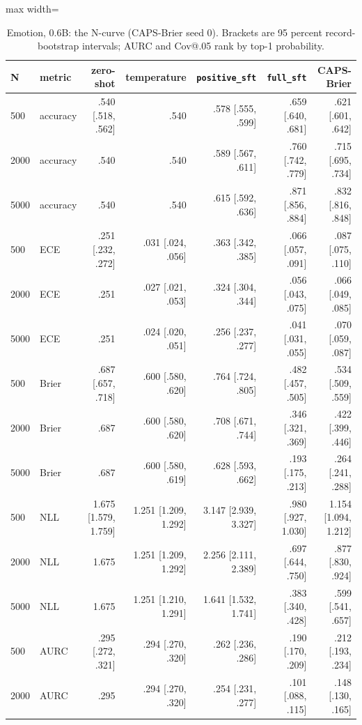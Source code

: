 \documentclass[10pt,letterpaper]{article}
\theoremstyle{plain}
\begin{document}
\begin{table}[H]
\centering
\footnotesize
\setlength{\tabcolsep}{3pt}
\caption{Emotion, 0.6B: the N-curve (CAPS-Brier seed 0). Brackets are 95 percent record-bootstrap intervals; AURC and Cov@.05 rank by top-1 probability.}
\label{tab:A7}
\begin{adjustbox}{max width=\textwidth}
\begin{tabular}{llrrrrr}
\toprule
N & metric & zero-shot & temperature & \texttt{positive\_sft} & \texttt{full\_sft} & CAPS-Brier \\
\midrule
500 & accuracy & .540 [.518, .562] & .540 & .578 [.555, .599] & .659 [.640, .681] & .621 [.601, .642] \\
2000 & accuracy & .540 & .540 & .589 [.567, .611] & .760 [.742, .779] & .715 [.695, .734] \\
5000 & accuracy & .540 & .540 & .615 [.592, .636] & .871 [.856, .884] & .832 [.816, .848] \\
500 & ECE & .251 [.232, .272] & .031 [.024, .056] & .363 [.342, .385] & .066 [.057, .091] & .087 [.075, .110] \\
2000 & ECE & .251 & .027 [.021, .053] & .324 [.304, .344] & .056 [.043, .075] & .066 [.049, .085] \\
5000 & ECE & .251 & .024 [.020, .051] & .256 [.237, .277] & .041 [.031, .055] & .070 [.059, .087] \\
500 & Brier & .687 [.657, .718] & .600 [.580, .620] & .764 [.724, .805] & .482 [.457, .505] & .534 [.509, .559] \\
2000 & Brier & .687 & .600 [.580, .620] & .708 [.671, .744] & .346 [.321, .369] & .422 [.399, .446] \\
5000 & Brier & .687 & .600 [.580, .619] & .628 [.593, .662] & .193 [.175, .213] & .264 [.241, .288] \\
500 & NLL & 1.675 [1.579, 1.759] & 1.251 [1.209, 1.292] & 3.147 [2.939, 3.327] & .980 [.927, 1.030] & 1.154 [1.094, 1.212] \\
2000 & NLL & 1.675 & 1.251 [1.209, 1.292] & 2.256 [2.111, 2.389] & .697 [.644, .750] & .877 [.830, .924] \\
5000 & NLL & 1.675 & 1.251 [1.210, 1.291] & 1.641 [1.532, 1.741] & .383 [.340, .428] & .599 [.541, .657] \\
500 & AURC & .295 [.272, .321] & .294 [.270, .320] & .262 [.236, .286] & .190 [.170, .209] & .212 [.193, .234] \\
2000 & AURC & .295 & .294 [.270, .320] & .254 [.231, .277] & .101 [.088, .115] & .148 [.130, .165] \\

\end{tabular}
\end{adjustbox}
\end{table}
\end{document}
